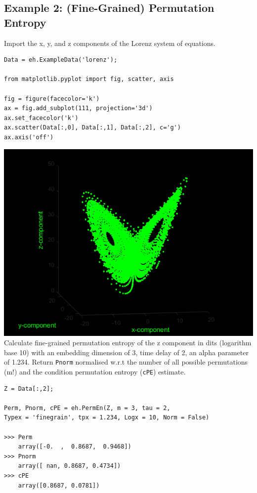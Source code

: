 \documentclass[12pt, a4paper, titlepage, openany]{book}
\begin{document}
\subsection{\normalsize Example 2: \hspace{15mm} (Fine-Grained) Permutation Entropy}
\noindent Import the x, y, and z components of the Lorenz system of equations.
\begin{verbatim}
Data = eh.ExampleData('lorenz');

from matplotlib.pyplot import fig, scatter, axis

fig = figure(facecolor='k')
ax = fig.add_subplot(111, projection='3d')
ax.set_facecolor('k')
ax.scatter(Data[:,0], Data[:,1], Data[:,2], c='g')
ax.axis('off')
\end{verbatim}
\includegraphics[scale=.6]{lorenz.png}\newline \newline
\noindent Calculate fine-grained permutation entropy of the z component in dits (logarithm base 10) with an embedding dimension of 3, time delay of 2, an alpha parameter of 1.234. Return \texttt{Pnorm} normalised w.r.t the number of all possible permutations (m!) and the condition permutation entropy (\texttt{cPE}) estimate.
\begin{verbatim}
Z = Data[:,2];

Perm, Pnorm, cPE = eh.PermEn(Z, m = 3, tau = 2, 
Typex = 'finegrain', tpx = 1.234, Logx = 10, Norm = False)

>>> Perm
	array([-0.  ,  0.8687,  0.9468])
>>> Pnorm
	array([ nan, 0.8687, 0.4734])
>>> cPE
	array([0.8687, 0.0781])
\end{verbatim}
\end{document}
